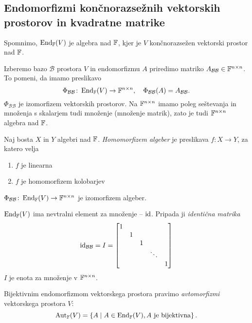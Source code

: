 \documentclass[12pt, a4paper]{article}
\begin{document}
\subsection{Endomorfizmi končnorazsežnih vektorskih prostorov in kvadratne matrike}

Spomnimo, $\operatorname{End}_{\mathbb{F}}(V)$ je algebra nad $\mathbb{F}$, kjer je $V$ končnorazsežen vektorski prostor nad $\mathbb{F}$.

Izberemo bazo $\mathcal{B}$ prostora $V$ in endomorfizmu $A$ priredimo matriko $A_{\mathcal{BB}}\in\mathbb{F}^{n\times n}$. To pomeni, da imamo preslikavo
\[
\Phi_{\mathcal{BB}}\colon\operatorname{End}_{\mathbb{F}}(V)\to\mathbb{F}^{n\times n},\quad\Phi_{\mathcal{BB}}(A)=A_{\mathcal{BB}}.
\]
$\Phi_{\mathcal{BB}}$ je izomorfizem vektorskih prostorov. Na $\mathbb{F}^{n\times n}$ imamo poleg seštevanja in množenja s skalarjem tudi množenje (množenje matrik), zato je tudi $\mathbb{F}^{n\times n}$ algebra nad $\mathbb{F}$.

\begin{definicija}
Naj bosta $X$ in $Y$ algebri nad $\mathbb{F}$. \emph{Homomorfizem algeber} je preslikava $f\colon X\to Y$, za katero velja

\begin{enumerate}[label=\arabic*)]
\item $f$ je linearna
\item $f$ je homomorfizem kolobarjev
\end{enumerate}
\end{definicija}

\begin{izrek}
$\Phi_{\mathcal{BB}}\colon\operatorname{End}_{\mathbb{F}}(V)\to\mathbb{F}^{n\times n}$ je izomorfizem algeber.
\end{izrek}

\obvs

$\operatorname{End}_{\mathbb{F}}(V)$ ima nevtralni element za množenje -- $\operatorname{id}$. Pripada ji \emph{identična matrika}
\[
\operatorname{id}_{\mathcal{BB}}=I=
\begin{bmatrix}
1 \\
& 1 \\
& & 1 \\
& & & \ddots \\
& & & & 1
\end{bmatrix}
\]
$I$ je enota za množenje v $\mathbb{F}^{n\times n}$.

\begin{definicija}
Bijektivnim endomorfizmom vektorskega prostora pravimo \emph{avtomorfizmi} vektorskega prostora $V$:
\[
\operatorname{Aut}_{\mathbb{F}}(V)=\left\{A\mid A\in\operatorname{End}_{\mathbb{F}}(V), \text{$A$ je bijektivna}\right\}.
\]
\end{definicija}
\end{document}
